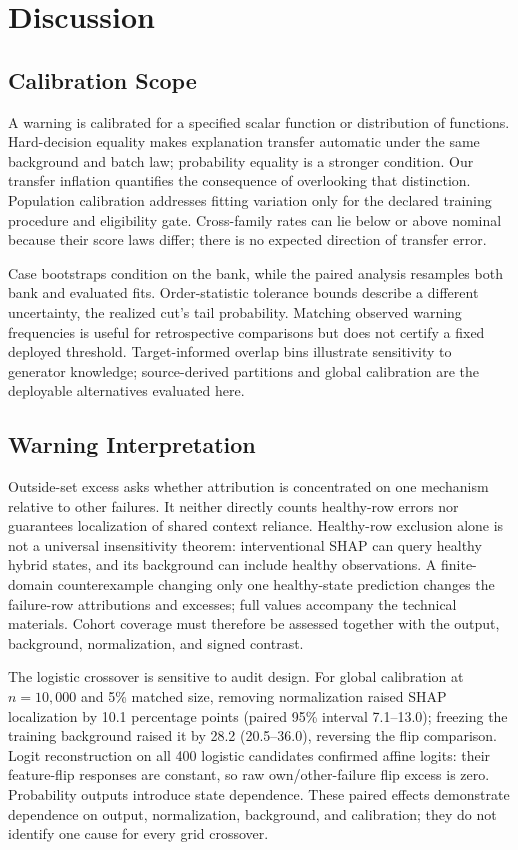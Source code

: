 \documentclass[conference]{IEEEtran}
\begin{document}
\section{Discussion}
\label{sec:analysis}
\subsection{Calibration Scope}
A warning is calibrated for a specified scalar function or distribution of functions. Hard-decision equality makes explanation transfer automatic under the same background and batch law; probability equality is a stronger condition. Our transfer inflation quantifies the consequence of overlooking that distinction. Population calibration addresses fitting variation only for the declared training procedure and eligibility gate. Cross-family rates can lie below or above nominal because their score laws differ; there is no expected direction of transfer error.

Case bootstraps condition on the bank, while the paired analysis resamples both bank and evaluated fits. Order-statistic tolerance bounds describe a different uncertainty, the realized cut's tail probability. Matching observed warning frequencies is useful for retrospective comparisons but does not certify a fixed deployed threshold. Target-informed overlap bins illustrate sensitivity to generator knowledge; source-derived partitions and global calibration are the deployable alternatives evaluated here.

\subsection{Warning Interpretation}
Outside-set excess asks whether attribution is concentrated on one mechanism relative to other failures. It neither directly counts healthy-row errors nor guarantees localization of shared context reliance. Healthy-row exclusion alone is not a universal insensitivity theorem: interventional SHAP can query healthy hybrid states, and its background can include healthy observations. A finite-domain counterexample changing only one healthy-state prediction changes the failure-row attributions and excesses; full values accompany the technical materials. Cohort coverage must therefore be assessed together with the output, background, normalization, and signed contrast.

The logistic crossover is sensitive to audit design. For global calibration at $n=10{,}000$ and 5\% matched size, removing normalization raised SHAP localization by 10.1 percentage points (paired 95\% interval 7.1--13.0); freezing the training background raised it by 28.2 (20.5--36.0), reversing the flip comparison. Logit reconstruction on all 400 logistic candidates confirmed affine logits: their feature-flip responses are constant, so raw own/other-failure flip excess is zero. Probability outputs introduce state dependence. These paired effects demonstrate dependence on output, normalization, background, and calibration; they do not identify one cause for every grid crossover.
\end{document}
